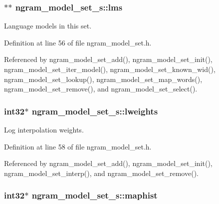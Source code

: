 \subsubsection[{lms}]{$\ast$$\ast$ ngram\-\_\-model\-\_\-set\-\_\-s\-::lms}\label{structngram__model__set__s_a862d4c4feb5a903101f4a0fdc5ba8a62}


Language models in this set. 



Definition at line 56 of file ngram\-\_\-model\-\_\-set.\-h.



Referenced by ngram\-\_\-model\-\_\-set\-\_\-add(), ngram\-\_\-model\-\_\-set\-\_\-init(), ngram\-\_\-model\-\_\-set\-\_\-iter\-\_\-model(), ngram\-\_\-model\-\_\-set\-\_\-known\-\_\-wid(), ngram\-\_\-model\-\_\-set\-\_\-lookup(), ngram\-\_\-model\-\_\-set\-\_\-map\-\_\-words(), ngram\-\_\-model\-\_\-set\-\_\-remove(), and ngram\-\_\-model\-\_\-set\-\_\-select().

\subsubsection[{lweights}]{\setlength{\rightskip}{0pt plus 5cm}int32$\ast$ ngram\-\_\-model\-\_\-set\-\_\-s\-::lweights}\label{structngram__model__set__s_a11068bb0029c788c506bec4507dd6d23}


Log interpolation weights. 



Definition at line 58 of file ngram\-\_\-model\-\_\-set.\-h.



Referenced by ngram\-\_\-model\-\_\-set\-\_\-add(), ngram\-\_\-model\-\_\-set\-\_\-init(), ngram\-\_\-model\-\_\-set\-\_\-interp(), and ngram\-\_\-model\-\_\-set\-\_\-remove().

\subsubsection[{maphist}]{\setlength{\rightskip}{0pt plus 5cm}int32$\ast$ ngram\-\_\-model\-\_\-set\-\_\-s\-::maphist}\label{structngram__model__set__s_af34ca232338c2d8c7dc8d13869ac09fd}


